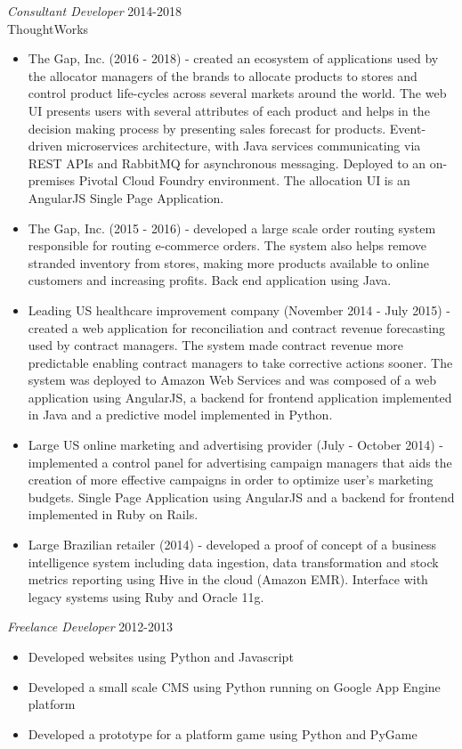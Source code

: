\documentclass[line,margin]{res}
\begin{document}
\begin{resume}
	{\sl Consultant Developer} \hfill 2014-2018\\
		ThoughtWorks
		\begin{itemize}
      \item The Gap, Inc. (2016 - 2018) - created an ecosystem of applications used by the allocator managers of the brands to allocate products 
        to stores and control product life-cycles across several markets around the world. The web UI presents users with several attributes of each product 
        and helps in the decision making process by presenting sales forecast for products. Event-driven microservices architecture, with Java services 
        communicating via REST APIs and RabbitMQ for asynchronous messaging. Deployed to an on-premises Pivotal Cloud Foundry environment. 
        The allocation UI is an AngularJS Single Page Application.
      \item The Gap, Inc. (2015 - 2016) - developed a large scale order routing system responsible for routing e-commerce orders. The system
        also helps remove stranded inventory from stores, making more products available to online customers and increasing profits. Back end application using Java.
      \item Leading US healthcare improvement company (November 2014 - July 2015) - created a web application for reconciliation and contract revenue forecasting used 
        by contract managers. The system made contract revenue more predictable enabling contract managers to take corrective actions sooner. The system was deployed to 
        Amazon Web Services and was composed of a web application using AngularJS, a backend for frontend application implemented in Java and a predictive model 
        implemented in Python.
      \item Large US online marketing and advertising provider (July - October 2014) - implemented a control panel for advertising campaign managers that aids the 
        creation of more effective campaigns in order to optimize user's marketing budgets. Single Page Application using AngularJS and a backend for frontend 
        implemented in Ruby on Rails.
      \item Large Brazilian retailer (2014) - developed a proof of concept of a business intelligence system including data ingestion, data transformation 
        and stock metrics reporting using Hive in the cloud (Amazon EMR).  Interface with legacy systems using Ruby and Oracle 11g.
		\end{itemize} 
                {\sl Freelance Developer} \hfill 2012-2013
                 \begin{itemize}  \itemsep -2pt %
                 \item Developed websites using Python and Javascript
                \item Developed a small scale CMS using Python running on Google App Engine platform
                \item Developed a prototype for a platform game using Python and PyGame
                \end{itemize}
 

\end{resume}
\end{document}
